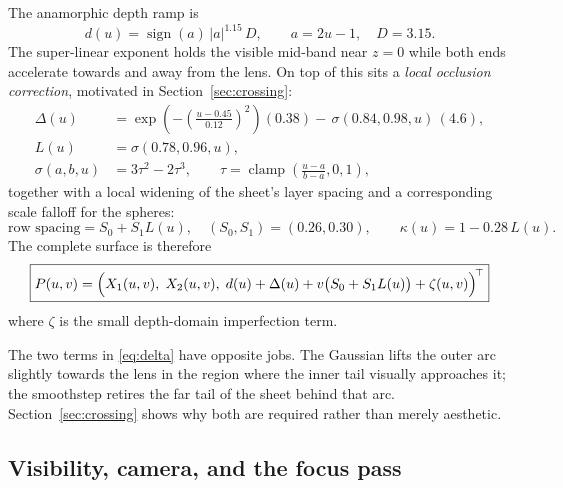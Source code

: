 \documentclass[11pt,a4paper]{article}
\theoremstyle{definition}
\begin{document}
The anamorphic depth ramp is
\begin{equation}
\label{eq:depthramp}
d(u)=\operatorname{sign}(a)\,\lvert a\rvert^{1.15}\,D,
\qquad a=2u-1,\quad D=3.15 .
\end{equation}
The super-linear exponent holds the visible mid-band near $z=0$ while both
ends accelerate towards and away from the lens. On top of this sits a
\emph{local occlusion correction}, motivated in Section~\ref{sec:crossing}:
\begin{align}
\Delta(u)&=
\exp\!\left(-\left(\frac{u-0.45}{0.12}\right)^{\!2}\right)\!(0.38)
-\,\sigma(0.84,0.98,u)\,(4.6), \label{eq:delta}\\
L(u)&=\sigma(0.78,0.96,u), \label{eq:layer}\\
\sigma(a,b,u)&=3\tau^2-2\tau^3,\qquad
\tau=\operatorname{clamp}\!\left(\frac{u-a}{b-a},0,1\right), \label{eq:smooth}
\end{align}
together with a local widening of the sheet's layer spacing and a
corresponding scale falloff for the spheres:
\begin{equation}
\label{eq:scale}
\text{row spacing}=S_0+S_1 L(u),\quad
(S_0,S_1)=(0.26,0.30),
\qquad
\kappa(u)=1-0.28\,L(u) .
\end{equation}
The complete surface is therefore
\begin{equation}
\label{eq:surface}
\boxed{
P(u,v)=\Bigl(X_1(u,v),\;X_2(u,v),\;d(u)+\Delta(u)+v\bigl(S_0+S_1L(u)\bigr)+\zeta(u,v)\Bigr)^{\!\top}
}
\end{equation}
where $\zeta$ is the small depth-domain imperfection term.

The two terms in \eqref{eq:delta} have opposite jobs. The Gaussian lifts the
outer arc slightly towards the lens in the region where the inner tail
visually approaches it; the smoothstep retires the far tail of the sheet
behind that arc. Section~\ref{sec:crossing} shows why both are required rather
than merely aesthetic.

\subsection{Visibility, camera, and the focus pass}
\end{document}
